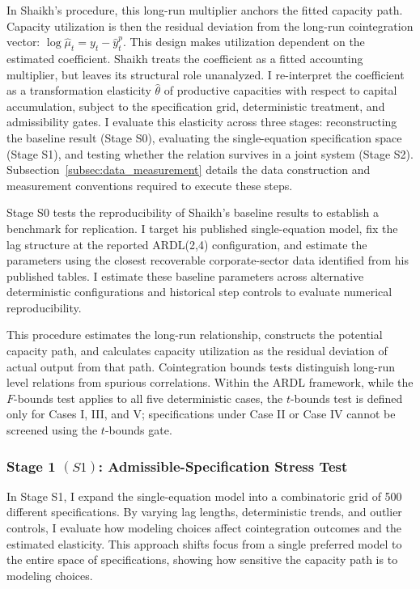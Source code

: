 In Shaikh's procedure, this long-run multiplier anchors the fitted capacity path. Capacity utilization is then the residual deviation from the long-run cointegration vector: $\log \hat{\mu}_t = y_t - \hat{y}^p_t$. This design makes utilization dependent on the estimated coefficient. Shaikh treats the coefficient as a fitted accounting multiplier, but leaves its structural role unanalyzed. I re-interpret the coefficient as a transformation elasticity $\hat{\theta}$ of productive capacities with respect to capital accumulation, subject to the specification grid, deterministic treatment, and admissibility gates. I evaluate this elasticity across three stages: reconstructing the baseline result (Stage S0), evaluating the single-equation specification space (Stage S1), and testing whether the relation survives in a joint system (Stage S2). Subsection~\ref{subsec:data_measurement} details the data construction and measurement conventions required to execute these steps.

Stage S0 tests the reproducibility of Shaikh's baseline results to establish a benchmark for replication. I target his published single-equation model, fix the lag structure at the reported ARDL(2,4) configuration, and estimate the parameters using the closest recoverable corporate-sector data identified from his published tables. I estimate these baseline parameters across alternative deterministic configurations and historical step controls to evaluate numerical reproducibility.

This procedure estimates the long-run relationship, constructs the potential capacity path, and calculates capacity utilization as the residual deviation of actual output from that path. Cointegration bounds tests distinguish long-run level relations from spurious correlations. Within the ARDL framework, while the $F$-bounds test applies to all five deterministic cases, the $t$-bounds test is defined only for Cases I, III, and V; specifications under Case II or Case IV cannot be screened using the $t$-bounds gate.

\subsubsection{Stage 1 \texorpdfstring{$(S1)$}{}: Admissible-Specification Stress Test}
\label{subsec:S1_admissible_spec}

In Stage S1, I expand the single-equation model into a combinatoric grid of 500 different specifications. By varying lag lengths, deterministic trends, and outlier controls, I evaluate how modeling choices affect cointegration outcomes and the estimated elasticity. This approach shifts focus from a single preferred model to the entire space of specifications, showing how sensitive the capacity path is to modeling choices.

